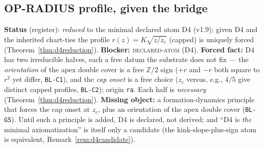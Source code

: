 \documentclass[11pt]{article}
\newcommand{\hx}[1]{\textcolor{cC}{\footnotesize\texttt{#1}}}
\newcommand{\Z}{\mathbb{Z}}
\theoremstyle{plain}
\theoremstyle{definition}
\theoremstyle{remark}
\begin{document}
\subsection{OP-RADIUS profile, given the bridge}\label{blk:radprof}
\textbf{Status} (register): \emph{reduced} to the minimal declared atom D4 (v1.9);
given D4 and the inherited chart-ties the profile $r(z)=K\sqrt{z/z_c}$ (capped) is
uniquely forced (Theorem~\ref{thm:d4reduction}). \textbf{Blocker:}
\textsc{declared-atom} (D4). \textbf{Forced fact:} D4 has two irreducible halves,
each a free datum the substrate does not fix --- the \emph{orientation} of the
apex double cover is a free $\Z/2$ sign ($+r$ and $-r$ both square to $r^2$ yet
differ, \hx{BL-C1}), and the \emph{cap onset} is a free choice ($z_c$ versus,
e.g., $4/5$ give distinct capped profiles, \hx{BL-C2}); origin \texttt{ra}. Each
half is \emph{necessary} (Theorem~\ref{thm:d4reduction}). \textbf{Missing
object:} a formation-dynamics principle that forces the cap onset at $z_c$, plus
an orientation of the apex double cover (\hx{BL-G5}). Until such a principle is
added, D4 is declared, not derived; and ``D4 is \emph{the} minimal
axiomatization'' is itself only a candidate (the kink-slope-plus-sign atom is
equivalent, Remark~\ref{rem:d4candidate}).
\end{document}
